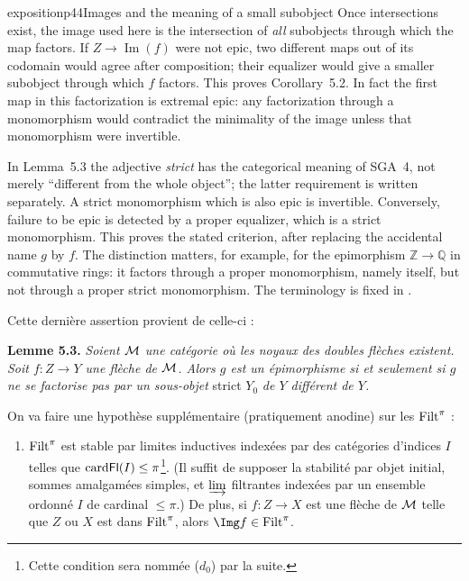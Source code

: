 \begin{dcomment}{exposition}{p44}{Images and the meaning of a small subobject}
Once intersections exist, the image used here is the intersection of \emph{all} subobjects through which the map factors. If $Z\to\operatorname{Im}(f)$ were not epic, two different maps out of its codomain would agree after composition; their equalizer would give a smaller subobject through which $f$ factors. This proves Corollary~5.2. In fact the first map in this factorization is extremal epic: any factorization through a monomorphism would contradict the minimality of the image unless that monomorphism were invertible.

In Lemma~5.3 the adjective \emph{strict} has the categorical meaning of SGA~4, not merely ``different from the whole object''; the latter requirement is written separately. A strict monomorphism which is also epic is invertible. Conversely, failure to be epic is detected by a proper equalizer, which is a strict monomorphism. This proves the stated criterion, after replacing the accidental name $g$ by $f$. The distinction matters, for example, for the epimorphism $\mathbb Z\to\mathbb Q$ in commutative rings: it factors through a proper monomorphism, namely itself, but not through a proper strict monomorphism. The terminology is fixed in \citep[Expos\'e~I, 10.2--10.5]{SGA4I1972}.
\end{dcomment}


Cette dernière assertion provient de celle-ci :

\textbf{Lemme 5.3.} \textit{Soient $\mathcal{M}$ une catégorie où les noyaux des doubles flèches existent. Soit $f : Z \longrightarrow Y$ une flèche de $\mathcal{M}$. Alors $g$ est un épimorphisme si et seulement si $g$ ne se factorise pas par un sous-objet} strict $Y_0$ \textit{de $Y$ différent de $Y$.} %

On va faire une hypothèse supplémentaire (pratiquement anodine) sur les $\mathrm{Filt}^{\pi}$ :

\begin{enumerate}[nosep]
\item[\textit{d})] $\mathrm{Filt}^{\pi}$ est stable par limites inductives indexées par des catégories d'indices $I$ telles que $\mathrm{card} \mathsf{Fl}(I) \leq \pi$\footnote[16]{Cette condition sera nommée ($d_0$) par la suite.}. (Il suffit de supposer la stabilité par objet initial, sommes amalgamées simples, et $\varinjlim$ filtrantes indexées par un ensemble ordonné $I$ de cardinal $\leq \pi$.) De plus, si $f : Z \longrightarrow X$ est une flèche de $\mathcal{M}$ telle que $Z$ ou $X$ est dans $\mathrm{Filt}^{\pi}$, alors $\Img f \in \Filt^{\pi}$.
\end{enumerate}

